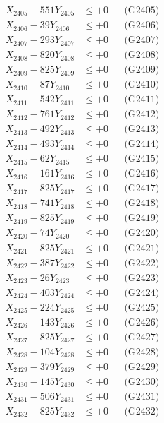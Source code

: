 \documentclass[a4paper,10pt]{article}
\begin{document}
{\begin{align}
X_{2405} - 551Y_{2405} &\leq +0 && \text{(G2405)} \\
X_{2406} - 39Y_{2406} &\leq +0 && \text{(G2406)} \\
X_{2407} - 293Y_{2407} &\leq +0 && \text{(G2407)} \\
X_{2408} - 820Y_{2408} &\leq +0 && \text{(G2408)} \\
X_{2409} - 825Y_{2409} &\leq +0 && \text{(G2409)} \\
X_{2410} - 87Y_{2410} &\leq +0 && \text{(G2410)} \\
\allowbreak
X_{2411} - 542Y_{2411} &\leq +0 && \text{(G2411)} \\
X_{2412} - 761Y_{2412} &\leq +0 && \text{(G2412)} \\
X_{2413} - 492Y_{2413} &\leq +0 && \text{(G2413)} \\
X_{2414} - 493Y_{2414} &\leq +0 && \text{(G2414)} \\
X_{2415} - 62Y_{2415} &\leq +0 && \text{(G2415)} \\
X_{2416} - 161Y_{2416} &\leq +0 && \text{(G2416)} \\
X_{2417} - 825Y_{2417} &\leq +0 && \text{(G2417)} \\
X_{2418} - 741Y_{2418} &\leq +0 && \text{(G2418)} \\
X_{2419} - 825Y_{2419} &\leq +0 && \text{(G2419)} \\
X_{2420} - 74Y_{2420} &\leq +0 && \text{(G2420)} \\
\allowbreak
X_{2421} - 825Y_{2421} &\leq +0 && \text{(G2421)} \\
X_{2422} - 387Y_{2422} &\leq +0 && \text{(G2422)} \\
X_{2423} - 26Y_{2423} &\leq +0 && \text{(G2423)} \\
X_{2424} - 403Y_{2424} &\leq +0 && \text{(G2424)} \\
X_{2425} - 224Y_{2425} &\leq +0 && \text{(G2425)} \\
X_{2426} - 143Y_{2426} &\leq +0 && \text{(G2426)} \\
X_{2427} - 825Y_{2427} &\leq +0 && \text{(G2427)} \\
X_{2428} - 104Y_{2428} &\leq +0 && \text{(G2428)} \\
X_{2429} - 379Y_{2429} &\leq +0 && \text{(G2429)} \\
X_{2430} - 145Y_{2430} &\leq +0 && \text{(G2430)} \\
\allowbreak
X_{2431} - 506Y_{2431} &\leq +0 && \text{(G2431)} \\
X_{2432} - 825Y_{2432} &\leq +0 && \text{(G2432)} \\

\end{align}}
\end{document}
